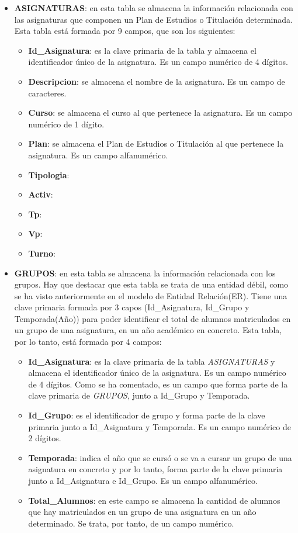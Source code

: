 \begin{itemize}
\item
\textbf{ASIGNATURAS}: en esta tabla se almacena la información relacionada con las asignaturas que componen un Plan de Estudios o Titulación determinada. Esta tabla está formada por 9 campos, que son los siguientes:
\begin{itemize}
\item
\textbf{Id\_Asignatura}: es la clave primaria de la tabla y almacena el identificador único de la asignatura. Es un campo numérico de 4 dígitos.
\item
\textbf{Descripcion}: se almacena el nombre de la asignatura. Es un campo de caracteres.
\item
\textbf{Curso}: se almacena el curso al que pertenece la asignatura. Es un campo numérico de 1 dígito.
\item
\textbf{Plan}: se almacena el Plan de Estudios o Titulación al que pertenece la asignatura. Es un campo alfanumérico.
\item
\textbf{Tipologia}:
\item
\textbf{Activ}:
\item
\textbf{Tp}:
\item
\textbf{Vp}:
\item
\textbf{Turno}:
\end{itemize}


\newpage

\item
\textbf{GRUPOS}: en esta tabla se almacena la información relacionada con los grupos. Hay que destacar que esta tabla se trata de una entidad débil, como se ha visto anteriormente en el modelo de Entidad Relación(ER). Tiene una clave primaria formada por 3 capos (Id\_Asignatura, Id\_Grupo y Temporada(Año)) para poder identificar el total de alumnos matriculados en un grupo de una asignatura, en un año académico en concreto. Esta tabla, por lo tanto, está formada por 4 campos:
\begin{itemize}
\item
\textbf{Id\_Asignatura}: es la clave primaria de la tabla \emph{ASIGNATURAS} y almacena el identificador único de la asignatura. Es un campo numérico de 4 dígitos. Como se ha comentado, es un campo que forma parte de la clave primaria de \emph{GRUPOS}, junto a  Id\_Grupo y Temporada.
\item
\textbf{Id\_Grupo}: es el identificador de grupo y forma parte de la clave primaria junto a  Id\_Asignatura y Temporada. Es un campo numérico de 2 dígitos.
\item
\textbf{Temporada}: indica el año que se cursó o se va a cursar un grupo de una asignatura en concreto y por lo tanto, forma parte de la clave primaria junto a  Id\_Asignatura e Id\_Grupo. Es un campo alfanumérico.
\item
\textbf{Total\_Alumnos}: en este campo se almacena la cantidad de alumnos que hay matriculados en un grupo de una asignatura en un año determinado. Se trata, por tanto, de un campo numérico.
\end{itemize}


\end{itemize}
